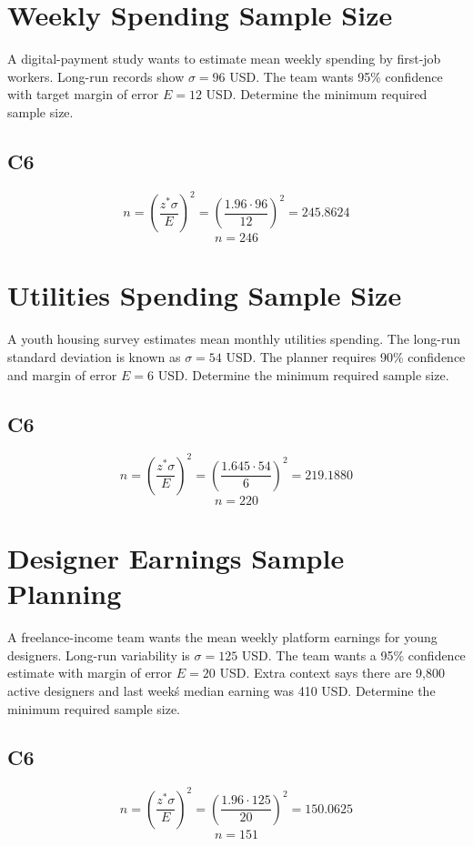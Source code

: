 	\begin{ExamProblems}
		\item
		\section{Weekly Spending Sample Size}
		A digital-payment study wants to estimate mean weekly spending by first-job workers. Long-run records show $\sigma = 96$ USD. The team wants 95\% confidence with target margin of error $E = 12$ USD. Determine the minimum required sample size.
		
		\subsection*{C6}
		\[
		n = \left(\frac{z^*\sigma}{E}\right)^2
		= \left(\frac{1.96 \cdot 96}{12}\right)^2
		= 245.8624
		\]
		\[
		n = 246
		\]
		
		\item
		\section{Utilities Spending Sample Size}
		A youth housing survey estimates mean monthly utilities spending. The long-run standard deviation is known as $\sigma = 54$ USD. The planner requires 90\% confidence and margin of error $E = 6$ USD. Determine the minimum required sample size.
		
		\subsection*{C6}
		\[
		n = \left(\frac{z^*\sigma}{E}\right)^2
		= \left(\frac{1.645 \cdot 54}{6}\right)^2
		= 219.1880
		\]
		\[
		n = 220
		\]
		
		\item
		\section{Designer Earnings Sample Planning}
		A freelance-income team wants the mean weekly platform earnings for young designers. Long-run variability is $\sigma = 125$ USD. The team wants a 95\% confidence estimate with margin of error $E = 20$ USD. Extra context says there are 9{,}800 active designers and last week\'s median earning was 410 USD. Determine the minimum required sample size.
		
		\subsection*{C6}
		\[
		n = \left(\frac{z^*\sigma}{E}\right)^2
		= \left(\frac{1.96 \cdot 125}{20}\right)^2
		= 150.0625
		\]
		\[
		n = 151
		\]
		

\end{ExamProblems}
